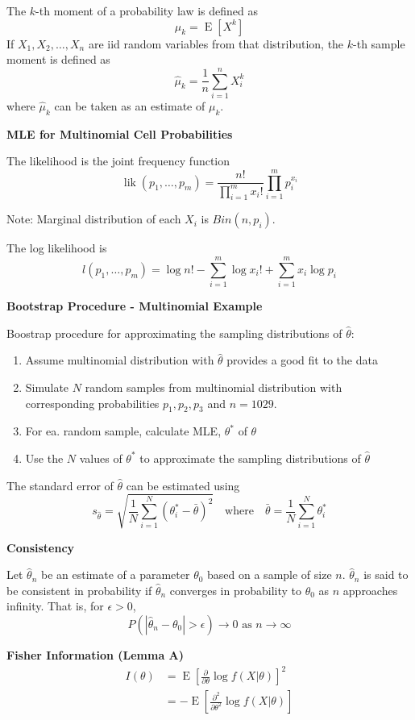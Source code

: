 \documentclass[a4paper]{article}
\newcommand{\subheading}[1]{{\scriptsize\textbf{#1}}}
\newcommand{\expectation}[1]{\operatorname{E}[#1]}
\begin{document}
\begin{multicols*}{4}
The $k$-th moment of a probability law is defined as
$$
\mu_k=\expectation{X^k}
$$
If $X_1, X_2, \ldots, X_n$ are iid random variables from that distribution, the $k$-th sample moment is defined as
$$
\hat{\mu}_k=\frac{1}{n} \sum_{i=1}^n X_i^k
$$
where $\hat{\mu}_k$ can be taken as an estimate of $\mu_k$.
\smallskip

\subheading{MLE for Multinomial Cell Probabilities}

The likelihood is the joint frequency function
$$
\operatorname{lik}\left(p_1, \ldots, p_m\right)=\frac{n !}{\prod_{i=1}^m x_{i} !} \prod_{i=1}^m p_i^{x_i}
$$

Note: Marginal distribution of each $X_i$ is $Bin\left(n, p_i\right)$.

The log likelihood is
$$
l\left(p_1, \ldots, p_m\right)=\log n !-\sum_{i=1}^m \log x_{i} !+\sum_{i=1}^m x_i \log p_i
$$


\subheading{Bootstrap Procedure - Multinomial Example}

Boostrap procedure for approximating the sampling distributions of $\hat{\theta}$:
\smallskip
\begin{enumerate}
    \item Assume multinomial distribution with $\hat{\theta}$ provides a good fit to the data
    \item Simulate $N$ random samples from multinomial distribution with corresponding probabilities $p_1,p_2,p_3$ and $n = 1029$.
    \item For ea. random sample, calculate MLE, $\theta^*$ of $\theta$
    \item Use the $N$ values of $\theta^*$ to approximate the sampling distributions of $\hat{\theta}$
\end{enumerate}
\smallskip
The standard error of $\hat{\theta}$ can be estimated using
$$
s_{\hat{\theta}} = \sqrt{\frac{1}{N}\sum_{i=1}^N (\theta^*_i - \bar{\theta})^2} \quad \text{where} \quad \bar{\theta} = \frac{1}{N}\sum_{i=1}^N \theta^*_i
$$

\subheading{Consistency}

  Let $\hat{\theta}_n$ be an estimate of a parameter $\theta_0$ based on a
  sample of size $n$. $\hat{\theta}_n$ is said to be consistent in probability if
  $\hat{\theta}_n$ converges in probability to $\theta_0$ as $n$ approaches
  infinity. That is, for $\epsilon > 0$,
  $$P(|\hat{\theta}_n - \theta_0| > \epsilon) \rightarrow 0 \text{ as } n
  \rightarrow \infty$$
  
\subheading{Fisher Information (Lemma A)}
  \begin{align*}
    I(\theta) &= \operatorname{E} \left [
      \frac{\partial}{\partial\theta} \log f(X|\theta)
    \right ]^2 \\
      &= - \operatorname{E} \left [
        \frac{\partial^2}{\partial\theta^2} \log f(X|\theta)
    \right ]
  \end{align*}


\end{multicols*}
\end{document}
